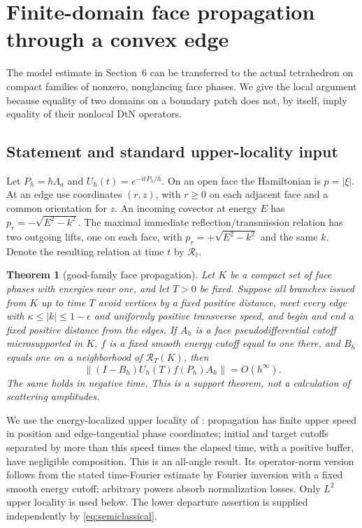 \documentclass[11pt]{amsart}
\numberwithin{equation}{section}
\newtheorem{theorem}{Theorem}[section]
\theoremstyle{remark}
\begin{document}
\section{Finite-domain face propagation through a convex edge}\label{sec:propagation}

The model estimate in Section~6 can be transferred to the actual tetrahedron on compact families of nonzero, nonglancing face phases. We give the local argument because equality of two domains on a boundary patch does not, by itself, imply equality of their nonlocal DtN operators.

\subsection{Statement and standard upper-locality input}
Let $P_h=h\Lambda_a$ and $U_h(t)=e^{-itP_h/h}$. On an open face the Hamiltonian is $p=|\xi|$. At an edge use coordinates $(r,z)$, with $r\ge0$ on each adjacent face and a common orientation for $z$. An incoming covector at energy $E$ has $p_r=-\sqrt{E^2-k^2}$. The maximal immediate reflection/transmission relation has two outgoing lifts, one on each face, with $p_r=+\sqrt{E^2-k^2}$ and the same $k$. Denote the resulting relation at time $t$ by $\mathcal R_t$.

\begin{theorem}[good-family face propagation]\label{thm:propagation}
Let $K$ be a compact set of face phases with energies near one, and let $T>0$ be fixed. Suppose all branches issued from $K$ up to time $T$ avoid vertices by a fixed positive distance, meet every edge with $\kappa\le|k|\le1-\epsilon$ and uniformly positive transverse speed, and begin and end a fixed positive distance from the edges. If $A_h$ is a face pseudodifferential cutoff microsupported in $K$, $f$ is a fixed smooth energy cutoff equal to one there, and $B_h$ equals one on a neighborhood of $\mathcal R_T(K)$, then
\begin{equation}\label{eq:propagation}
\|(I-B_h)U_h(T)f(P_h)A_h\|=O(h^\infty) .
\end{equation}
The same holds in negative time. This is a support theorem, not a calculation of scattering amplitudes.
\end{theorem}

We use the energy-localized upper locality of \cite[Propositions~3.1 and~3.5]{I}: propagation has finite upper speed in position and edge-tangential phase coordinates; initial and target cutoffs separated by more than this speed times the elapsed time, with a positive buffer, have negligible composition. This is an all-angle result. Its operator-norm version follows from the stated time-Fourier estimate by Fourier inversion with a fixed smooth energy cutoff; arbitrary powers absorb normalization losses. Only $L^2$ upper locality is used below. The lower departure assertion is supplied independently by \eqref{eq:semiclassical}.
\end{document}
